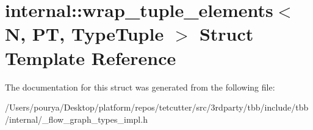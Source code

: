 \hypertarget{structinternal_1_1wrap__tuple__elements}{}\section{internal\+:\+:wrap\+\_\+tuple\+\_\+elements$<$ N, P\+T, Type\+Tuple $>$ Struct Template Reference}
\label{structinternal_1_1wrap__tuple__elements}


The documentation for this struct was generated from the following file\+:\begin{DoxyCompactItemize}
\item 
/\+Users/pourya/\+Desktop/platform/repos/tetcutter/src/3rdparty/tbb/include/tbb/internal/\+\_\+flow\+\_\+graph\+\_\+types\+\_\+impl.\+h\end{DoxyCompactItemize}
